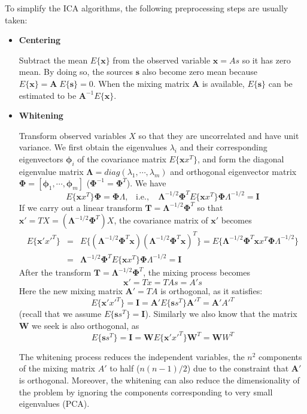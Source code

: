 To simplify the ICA algorithms, the following preprocessing steps are usually
taken:
\begin{itemize}
\item {\bf Centering}

Subtract the mean $E\{{\mathbf x}\}$ from the observed variable ${\mathbf x=As}$
so it has zero mean. By doing so, the sources ${\mathbf s}$ also become zero
mean because $E\{{\mathbf x}\}={\mathbf A}\;E\{{\mathbf s}\}=0$. When the
mixing matrix ${\mathbf A}$ is available, $E\{{\mathbf s}\}$ can be estimated
to be ${\mathbf A}^{-1}E\{{\mathbf x}\}$.

\item {\bf Whitening}

Transform observed variables $X$ so that they are uncorrelated and have unit
variance. We first obtain the eigenvalues $\lambda_i$ and their corresponding
eigenvectors ${\mathbf \phi}_i$ of the covariance matrix $E\{{\mathbf xx}^T\}$,
and form the diagonal eigenvalue matrix ${\mathbf \Lambda}=diag(\lambda_1,
\cdots,\lambda_m)$ and orthogonal eigenvector matrix ${\mathbf \Phi}=
[{\mathbf \phi}_1,\cdots,{\mathbf \phi}_m]$ (${\mathbf \Phi}^{-1}={\mathbf \Phi}^T$).
We have
\[	E\{{\mathbf xx}^T\}{\mathbf \Phi}={\mathbf \Phi\Lambda},
	\;\;\;\mbox{i.e.,}\;\;\;\;
	{\mathbf \Lambda}^{-1/2}{\mathbf \Phi}^T E\{{\mathbf xx}^T\}
	{\mathbf \Phi \Lambda^{-1/2}}={\mathbf I}	\]
If we carry out a linear transform ${\mathbf T}={\mathbf \Lambda}^{-1/2}
{\mathbf \Phi}^T$ so that ${\mathbf x'=TX}=({\mathbf \Lambda}^{-1/2}{\mathbf \Phi}^T) X$, the covariance matrix of ${\mathbf x}'$ becomes
\begin{eqnarray}
E\{{\mathbf x'x'}^T\}&=&E\{({\mathbf \Lambda}^{-1/2}{\mathbf \Phi}^T {\mathbf x})
	({\mathbf \Lambda}^{-1/2}{\mathbf \Phi}^T {\mathbf x})^T\}
	=E\{{\mathbf \Lambda}^{-1/2}{\mathbf \Phi}^T {\mathbf xx}^T
	{\mathbf \Phi \Lambda}^{-1/2}\}
	\nonumber \\
	&=&{\mathbf \Lambda}^{-1/2}{\mathbf \Phi}^T E\{{\mathbf xx}^T\}
	{\mathbf \Phi \Lambda}^{-1/2}={\mathbf I }
	\nonumber
\end{eqnarray}
After the transform ${\mathbf T}={\mathbf \Lambda}^{-1/2}{\mathbf \Phi}^T$,
the mixing process becomes
\[	{\mathbf x'=Tx=TAs=A's}	\]
Here the new mixing matrix ${\mathbf A'=TA}$ is orthogonal, as it satisfies:
\[	E\{{\mathbf x'x'}^T\}={\mathbf I}={\mathbf A}'E\{{\mathbf ss}^T\}
	{\mathbf A'}^T={\mathbf A'A'}^T	\]
(recall that we assume $E\{{\mathbf ss}^T\}={\mathbf I}$). Similarly we also
know that the matrix ${\mathbf W}$ we seek is also orthogonal, as
\[	E\{{\mathbf ss}^T\}={\mathbf I}={\mathbf W}E\{{\mathbf x'x'}^T\}
	{\mathbf W}^T={\mathbf WW}^T	\]

The whitening process reduces the independent variables, the $n^2$ components
of the mixing matrix $A'$ to half ($n(n-1)/2$) due to the constraint that
${\mathbf A}'$ is orthogonal. Moreover, the whitening can also reduce the
dimensionality of the problem by ignoring the components corresponding to
very small eigenvalues (PCA).

\end{itemize}

